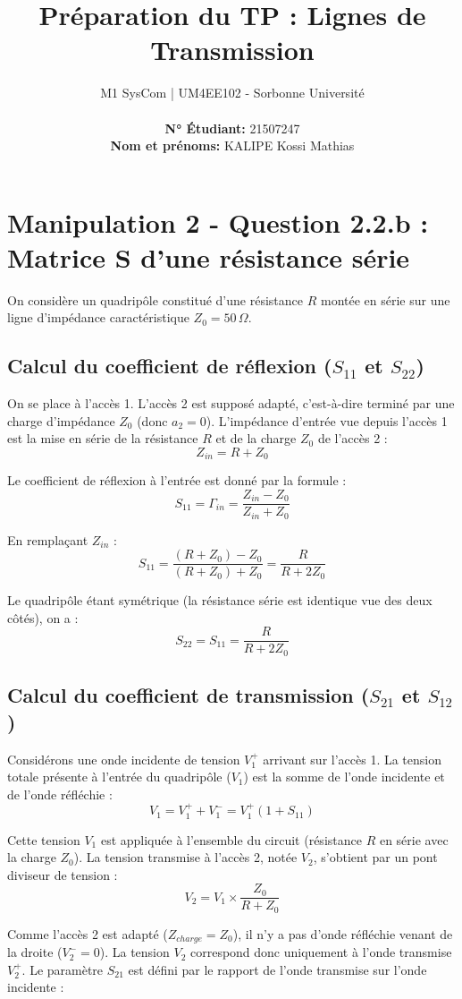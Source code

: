 \documentclass[12pt,a4paper]{article}
\title{\textbf{Préparation du TP : Lignes de Transmission}}
\author{M1 SysCom | UM4EE102 - Sorbonne Université \\ \\ \textbf{N° Étudiant:} 21507247 \\ \textbf{Nom et prénoms:} KALIPE Kossi Mathias}
\date{}
\begin{document}
\maketitle

\section{Manipulation 2 - Question 2.2.b : Matrice S d'une résistance série}

On considère un quadripôle constitué d'une résistance $R$ montée en série sur une ligne d'impédance caractéristique $Z_0 = 50\,\Omega$.

\subsection{Calcul du coefficient de réflexion ($S_{11}$ et $S_{22}$)}

On se place à l'accès 1. L'accès 2 est supposé adapté, c'est-à-dire terminé par une charge d'impédance $Z_0$ (donc $a_2 = 0$).
L'impédance d'entrée vue depuis l'accès 1 est la mise en série de la résistance $R$ et de la charge $Z_0$ de l'accès 2 :
$$Z_{in} = R + Z_0$$

Le coefficient de réflexion à l'entrée est donné par la formule :
$$S_{11} = \Gamma_{in} = \frac{Z_{in} - Z_0}{Z_{in} + Z_0}$$

En remplaçant $Z_{in}$ :
$$S_{11} = \frac{(R + Z_0) - Z_0}{(R + Z_0) + Z_0} = \frac{R}{R + 2Z_0}$$

Le quadripôle étant symétrique (la résistance série est identique vue des deux côtés), on a :
$$S_{22} = S_{11} = \frac{R}{R + 2Z_0}$$

\subsection{Calcul du coefficient de transmission ($S_{21}$ et $S_{12}$)}

Considérons une onde incidente de tension $V_1^+$ arrivant sur l'accès 1. La tension totale présente à l'entrée du quadripôle ($V_1$) est la somme de l'onde incidente et de l'onde réfléchie :
$$V_1 = V_1^+ + V_1^- = V_1^+ (1 + S_{11})$$

Cette tension $V_1$ est appliquée à l'ensemble du circuit (résistance $R$ en série avec la charge $Z_0$). La tension transmise à l'accès 2, notée $V_2$, s'obtient par un pont diviseur de tension :
$$V_2 = V_1 \times \frac{Z_0}{R + Z_0}$$

Comme l'accès 2 est adapté ($Z_{charge} = Z_0$), il n'y a pas d'onde réfléchie venant de la droite ($V_2^- = 0$). La tension $V_2$ correspond donc uniquement à l'onde transmise $V_2^+$. Le paramètre $S_{21}$ est défini par le rapport de l'onde transmise sur l'onde incidente :
\end{document}
